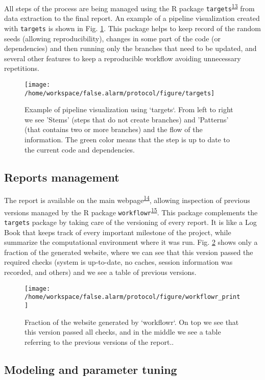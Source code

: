 \documentclass[12pt,twoside]{fmupthesis}
\begin{document}
All steps of the process are being managed using the R package \texttt{targets}\textsuperscript{\protect\hyperlink{ref-landau2021}{13}} from data
extraction to the final report. An example of a pipeline visualization created with \texttt{targets} is
shown in Fig. \ref{fig:targets}. This package helps to keep record of the random seeds (allowing
reproducibility), changes in some part of the code (or dependencies) and then running only the
branches that need to be updated, and several other features to keep a reproducible workflow
avoiding unnecessary repetitions.
\begin{figure}

{\centering \texttt{[image: /home/workspace/false.alarm/protocol/figure/targets]} 

}

\caption{Example of pipeline visualization using `targets`. From left to right we see 'Stems' (steps that do not create branches) and 'Patterns' (that contains two or more branches) and the flow of the information. The green color means that the step is up to date to the current code and dependencies.}\label{fig:targets}
\end{figure}
\hypertarget{reports-management}{%
\subsection{Reports management}\label{reports-management}}

The report is available on the main webpage\textsuperscript{\protect\hyperlink{ref-franz_website}{14}}, allowing inspection of previous
versions managed by the R package \texttt{workflowr}\textsuperscript{\protect\hyperlink{ref-workflowr2021}{15}}. This package complements the
\texttt{targets} package by taking care of the versioning of every report. It is like a Log Book that keeps
track of every important milestone of the project, while summarize the computational environment
where it was run. Fig. \ref{fig:workflowr} shows only a fraction of the generated website, where we
can see that this version passed the required checks (system is up-to-date, no caches, session
information was recorded, and others) and we see a table of previous versions.
\begin{figure}

{\centering \texttt{[image: /home/workspace/false.alarm/protocol/figure/workflowr\_print]} 

}

\caption{Fraction of the website generated by `workflowr`. On top we see that this version passed all checks, and in the middle we see a table referring to the previous versions of the report..}\label{fig:workflowr}
\end{figure}
\hypertarget{modeling-and-parameter-tuning}{%
\subsection{Modeling and parameter tuning}\label{modeling-and-parameter-tuning}}
\end{document}
